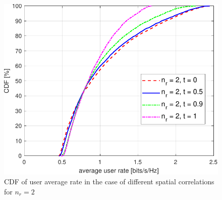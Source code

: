 \documentclass[10pt,conference]{IEEEtran}
\begin{document}
\begin{figure} [htb]
    \centering
    \includegraphics[width=1\linewidth]{Fig7.pdf}
    \caption{CDF of user average rate in the case of different spatial correlations for $n_r=2$}
    \label{fig7}
\end{figure}


\end{document}
